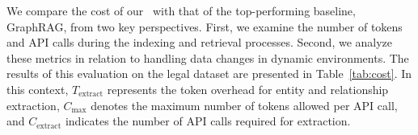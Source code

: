 
We compare the cost of our \model\ with that of the top-performing baseline, GraphRAG, from two key perspectives. First, we examine the number of tokens and API calls during the indexing and retrieval processes. Second, we analyze these metrics in relation to handling data changes in dynamic environments. The results of this evaluation on the legal dataset are presented in Table~\ref{tab:cost}. In this context, $T_{\text{extract}}$ represents the token overhead for entity and relationship extraction, $C_{\text{max}}$ denotes the maximum number of tokens allowed per API call, and $C_{\text{extract}}$ indicates the number of API calls required for extraction.

